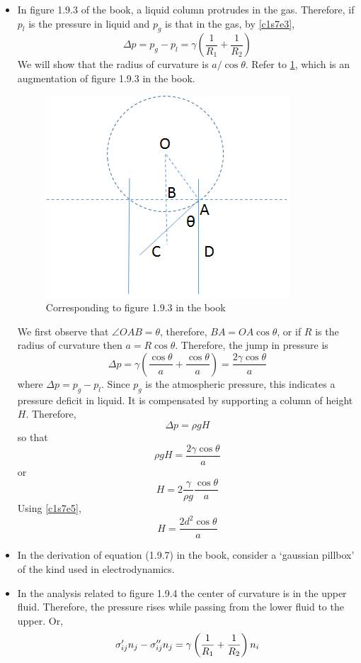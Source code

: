\begin{itemize}
\item In figure 1.9.3 of the book, a liquid column protrudes in the gas. Therefore, if $p_l$ is the pressure in liquid and $p_g$ is that in the gas, by \eqref{c1s7e3},
\[
\Delta p = p_g - p_l = \gamma\left(\frac{1}{R_1} + \frac{1}{R_2}\right)
\]
We will show that the radius of curvature is $a/\cos\theta$. Refer to \ref{c1f1}, which is an augmentation of figure 1.9.3 in the book.
\begin{figure}[!ht]
\centering
\centerline{\includegraphics[scale=.5]{c1f1}}
\caption{Corresponding to figure 1.9.3 in the book}
\label{c1f1}
\end{figure}
We first observe that $\angle OAB = \theta$, therefore, $BA = OA\cos\theta$, or if $R$ is the radius of curvature then $a = R\cos\theta$. Therefore, the jump in pressure is
\[
\Delta p = \gamma\left(\frac{\cos\theta}{a} + \frac{\cos\theta}{a}\right) = \frac{2\gamma\cos\theta}{a}
\]
where $\Delta p = p_g - p_l$. Since $p_g$ is the atmospheric pressure, this indicates a pressure deficit in liquid. It is compensated by supporting a column of height $H$. Therefore,
\[
\Delta p = \rho g H
\]
so that
\[
\rho g H = \frac{2\gamma\cos\theta}{a}
\]
or
\[
H = 2\frac{\gamma}{\rho g}\frac{\cos\theta}{a}
\]
Using \eqref{c1s7e5},
\[
H = \frac{2d^2\cos\theta}{a}
\]

\item In the derivation of equation (1.9.7) in the book, consider a \enquote*{gaussian pillbox} of the kind used in electrodynamics.

\item In the analysis related to figure 1.9.4 the center of curvature is in the upper fluid. Therefore, the pressure rises while passing from the lower fluid to the upper. Or,
\begin{equation}\label{c1s7e7}
\sigma^\prime_{ij}n_j - \sigma^{\prime\prime}_{ij}n_j = \gamma\left(\frac{1}{R_1} + \frac{1}{R_2}\right)n_i
\end{equation}
\end{itemize}

